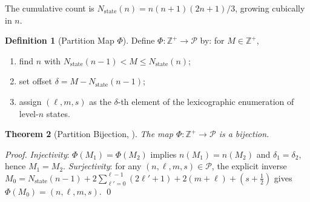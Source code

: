 \documentclass[twocolumn,10pt,a4paper]{article}
\theoremstyle{thmstyle}
\newtheorem{theorem}{Theorem}[section]
\theoremstyle{definition}
\newtheorem{definition}[theorem]{Definition}
\theoremstyle{remark}
\newcommand{\Zp}{\mathbb{Z}^{+}}
\newcommand{\Parts}{\mathcal{P}}
\newcommand{\PhiMap}{\varPhi}
\newcommand{\Mcyc}{M}
\begin{document}
The cumulative count is $N_\text{state}(n) = n(n+1)(2n+1)/3$, growing
cubically in $n$.

\begin{definition}[Partition Map $\PhiMap$]
\label{def:phi}
Define $\PhiMap: \Zp \to \Parts$ by: for $\Mcyc \in \Zp$,
\begin{enumerate}[nosep,label=(\roman*)]
\item find $n$ with $N_\text{state}(n{-}1) < \Mcyc \leq N_\text{state}(n)$;
\item set offset $\delta = \Mcyc - N_\text{state}(n{-}1)$;
\item assign $(\ell, m, s)$ as the $\delta$-th element of the lexicographic
  enumeration of level-$n$ states.
\end{enumerate}
\end{definition}

\begin{theorem}[Partition Bijection, \citealp{cantor1874,dedekind1888}]
\label{thm:bijection}
The map $\PhiMap: \Zp \to \Parts$ is a bijection.
\end{theorem}

\begin{proof}
\textit{Injectivity}: $\PhiMap(\Mcyc_1) = \PhiMap(\Mcyc_2)$ implies
$n(\Mcyc_1) = n(\Mcyc_2)$ and $\delta_1 = \delta_2$, hence $\Mcyc_1 = \Mcyc_2$.
\textit{Surjectivity}: for any $(n,\ell,m,s) \in \Parts$, the explicit
inverse $\Mcyc_0 = N_\text{state}(n{-}1) + 2\sum_{\ell'=0}^{\ell-1}(2\ell'{+}1)
+ 2(m+\ell) + (s+\tfrac{1}{2})$ gives $\PhiMap(\Mcyc_0) = (n,\ell,m,s)$.
\qed
\end{proof}
\end{document}
